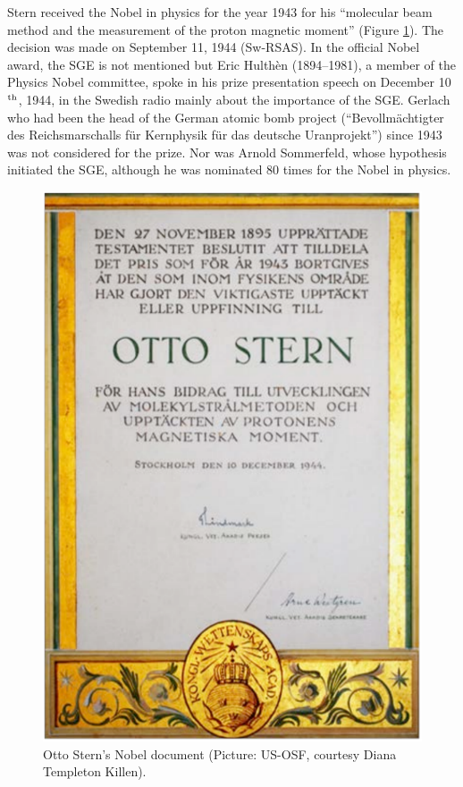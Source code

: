 \documentclass[12pt]{article}
\begin{document}
Stern received the Nobel in physics for the year 1943 for his ``molecular beam method and the measurement of the proton magnetic moment'' (Figure \ref{fig:Nobel_doc}). The decision was made on September 11, 1944 (Sw-RSAS). In the official Nobel award, the SGE is not mentioned but Eric Hulthèn (1894--1981), a member of the Physics Nobel committee, spoke in his prize presentation speech on December 10$^{\rm th}$, 1944, in the Swedish radio mainly about the importance of the SGE. Gerlach who had been the head of the German atomic bomb project (``Bevollmächtigter des Reichsmarschalls für Kernphysik für das deutsche Uranprojekt'') since 1943 was not considered for the prize. Nor was Arnold Sommerfeld, whose hypothesis initiated the SGE, although he was nominated 80 times for the Nobel in physics. 
%
\begin{figure}
\begin{center}
\includegraphics[scale=0.45]{figures/Nobel_doc}
\caption{Otto Stern's Nobel document (Picture: US-OSF, courtesy Diana Templeton Killen). }
\label{fig:Nobel_doc}
\end{center}
\end{figure}
\end{document}
